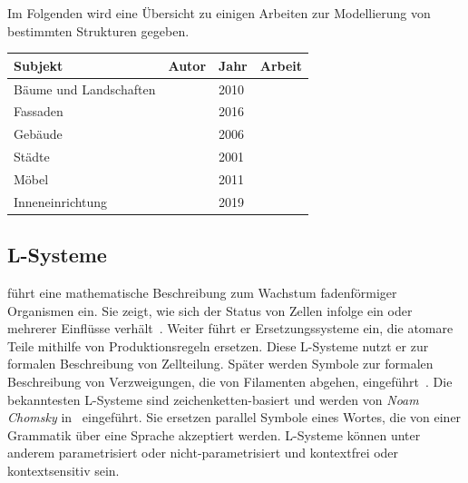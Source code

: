 Im Folgenden wird eine Übersicht zu einigen Arbeiten zur Modellierung von bestimmten Strukturen gegeben.
\begin{center}
    \begin{tabular}{l|l|l|l}
        Subjekt & Autor & Jahr & Arbeit\\
        \hline
        Bäume und Landschaften & ~\citeauthor{deussen_2010} & 2010 & ~\cite{deussen_2010} \\
        Fassaden & ~\citeauthor{alhalawani_2013} & 2016 & ~\cite{alhalawani_2013} \\
        Gebäude & ~\citeauthor{mueller_2006} & 2006 & ~\cite{mueller_2006} \\
        Städte & ~\citeauthor{parish_2001} & 2001 & ~\cite{parish_2001} \\
        Möbel & ~\citeauthor{merrell_2011} & 2011 &  ~\cite{merrell_2011} \\
        Inneneinrichtung & ~\citeauthor{zhang_2019} & 2019 & ~\cite{zhang_2019} \\
    \end{tabular}
\end{center}

\subsection*{L-Systeme}
\citeauthor{lindemayer_1968} führt eine mathematische Beschreibung zum Wachstum fadenförmiger Organismen ein.
Sie zeigt, wie sich der Status von Zellen infolge ein oder mehrerer Einflüsse verhält~\cite{lindemayer_1968}.
Weiter führt er Ersetzungssysteme ein, die atomare Teile mithilfe von Produktionsregeln ersetzen.
Diese L-Systeme nutzt er zur formalen Beschreibung von Zellteilung.
Später werden Symbole zur formalen Beschreibung von Verzweigungen, die von Filamenten abgehen, eingeführt~\cite{prusinkiewicz_1990}.
Die bekanntesten L-Systeme sind zeichenketten-basiert und werden von \textit{Noam Chomsky} in~\cite{chomsky_1956} eingeführt.
Sie ersetzen parallel Symbole eines Wortes, die von einer Grammatik über eine Sprache akzeptiert werden.
L-Systeme können unter anderem parametrisiert oder nicht-parametrisiert und kontextfrei oder kontextsensitiv sein.

\newpage

